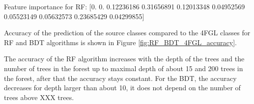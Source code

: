 
Feature importance for RF: [0.         0.         0.12236186 0.31656891 0.12013348 0.04952569  0.05523149 0.05632573 0.23685429 0.04299855]


Accuracy of the prediction of the source classes compared to the 4FGL classes for RF and BDT algorithms is shown in Figure \ref{fig:RF_BDT_4FGL_accuracy}.



The accuracy of the RF algorithm increases with the depth of the trees and the number of trees in the forest
up to maximal depth of about 15 and 200 trees in the forest, after that the accuracy stays constant.
For the BDT, the accuracy decreases for depth larger than about 10, it does not depend on the number of trees above XXX trees.


